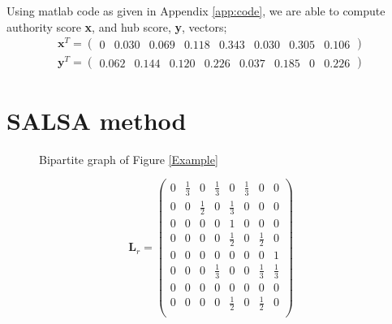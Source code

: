 \documentclass[11pt]{report}
\begin{document}
Using matlab code as given in Appendix \ref{app:code}, we are able to compute authority score \textbf{x}, and hub score, \textbf{y}, vectors;
\begin{eqnarray}
\textbf{x}^T = \left( \begin{array} {cccccccc}
0 & 0.030 & 0.069 & 0.118 & 0.343 &0.030 &0.305 &0.106
\end{array}\right) \\
\textbf{y}^T = \left( \begin{array} {cccccccc}
0.062 & 0.144 & 0.120 & 0.226 & 0.037 & 0.185 & 0 & 0.226
\end{array}\right)
\end{eqnarray}
\section{SALSA method} \label{sec:SALSA}
\begin{figure}[H]
\centering
{}\caption{Bipartite graph of Figure \ref{Example} } \label{bipartite}
\end{figure}

\begin{equation}
\textbf{L}_r=\left(
\begin{array}{cccccccc}
0 & \frac{1}{3} & 0 & \frac{1}{3} & 0 & \frac{1}{3} & 0 & 0 \\
0 & 0 & \frac{1}{2} & 0 & \frac{1}{3} & 0 & 0 & 0 \\
0 & 0 & 0 & 0 & 1 & 0 & 0 & 0\\
0 & 0 & 0 & 0 & \frac{1}{2} & 0 & \frac{1}{2} & 0 \\
0 & 0 & 0 & 0 & 0 & 0 & 0 & 1 \\
0 & 0 & 0 & \frac{1}{3} & 0 & 0 & \frac{1}{3} & \frac{1}{3} \\
0 & 0 & 0 & 0 & 0 & 0 & 0 & 0 \\
0 & 0 & 0 & 0 & \frac{1}{2} & 0 & \frac{1}{2} & 0 \\
\end{array}
\right)
\end{equation} 
\end{document}
